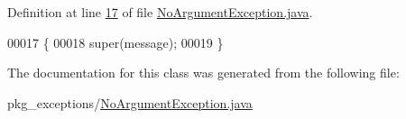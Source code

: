 Definition at line \hyperlink{NoArgumentException_8java_source_l00017}{17} of file \hyperlink{NoArgumentException_8java_source}{No\-Argument\-Exception.\-java}.


\begin{DoxyCode}
00017                                               \{
00018         super(message);
00019     \}
\end{DoxyCode}


The documentation for this class was generated from the following file\-:\begin{DoxyCompactItemize}
\item 
pkg\-\_\-exceptions/\hyperlink{NoArgumentException_8java}{No\-Argument\-Exception.\-java}\end{DoxyCompactItemize}
